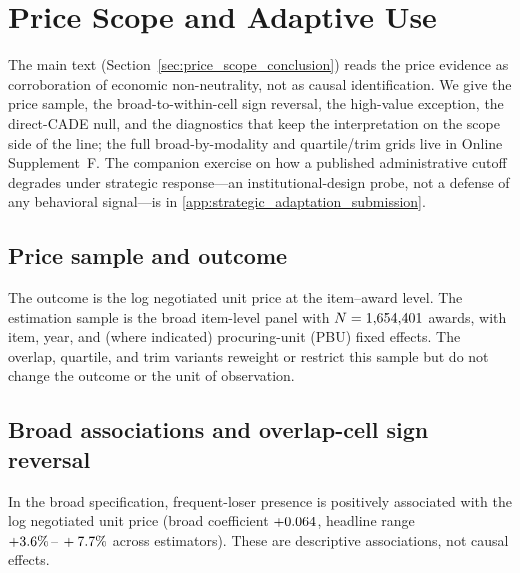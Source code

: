 \section{Price Scope and Adaptive Use}
\label{app:scope_adaptation_submission}

The main text (Section~\ref{sec:price_scope_conclusion}) reads the price
evidence as corroboration of economic non-neutrality, not as causal
identification. We give the price sample, the broad-to-within-cell sign
reversal, the high-value exception, the direct-CADE null, and the
diagnostics that keep the interpretation on the scope side of the line;
the full broad-by-modality and quartile/trim grids live in Online
Supplement~F. The companion exercise on how a published
administrative cutoff degrades under strategic response---an
institutional-design probe, not a defense of any behavioral signal---is in
\ref{app:strategic_adaptation_submission}.

\subsection{Price sample and outcome}
\label{app:scope_sample_submission}

The outcome is the log negotiated unit price at the item--award level. The
estimation sample is the broad item-level panel with $N=1{,}654{,}401$
awards, with item, year, and (where indicated) procuring-unit (PBU) fixed
effects. The overlap, quartile, and trim variants reweight or restrict this
sample but do not change the outcome or the unit of observation.

\subsection{Broad associations and overlap-cell sign reversal}
\label{app:scope_broad_submission}

In the broad specification, frequent-loser presence is positively
associated with the log negotiated unit price (broad coefficient
$+0.064$, headline range $+3.6\%\,\text{--}\,+7.7\%$ across estimators).
These are descriptive associations, not causal effects.

